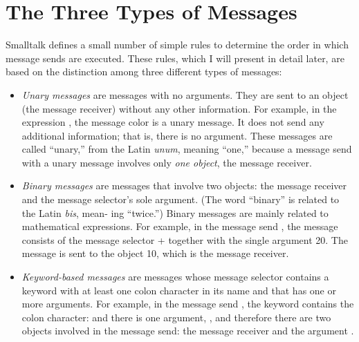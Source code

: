 \documentclass[a4paper,10pt,twoside]{book}
\begin{document}
\section{The Three Types of Messages }

Smalltalk defines a small number of simple rules to determine the order in which message 
sends are executed. These rules, which I will present in detail later, are based on the distinction 
among three different types of messages: 

\begin{itemize}
\item  \emph{Unary messages} are messages with no arguments. They are sent to an object (the 
message receiver) without any other information. For example, in the expression , 
the message color is a unary message. It does not send any additional information; 
that is, there is no argument. These messages are called “unary,” from the Latin 
\emph{unum}, meaning “one,” because a message send with a unary message involves only 
\emph{one object}, the message receiver. 

\item  \emph{Binary messages} are messages that involve two objects: the message receiver and the 
message selector’s sole argument. (The word “binary” is related to the Latin \emph{bis}, mean- 
ing “twice.”) Binary messages are mainly related to mathematical expressions. For 
example, in the message send , the message consists of the message selector + 
together with the single argument 20. The message  is sent to the object 10, which 
is the message receiver. 

\item  \emph{Keyword-based messages} are messages whose message selector contains a keyword 
with at least one colon character \ct{:} in its name and that has one or more arguments. For 
example, in the message send , the keyword  contains the colon character: and 
there is one argument, , and therefore there are two objects involved in 
the message send: the message receiver  and the argument . 
\end{itemize}


\end{document}
